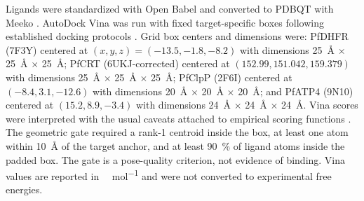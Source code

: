 \documentclass[11pt,a4paper]{article}
\begin{document}
	Ligands were standardized with Open Babel \cite{OBoyle2011} and converted to PDBQT with Meeko \cite{Eberhardt2021}. AutoDock Vina was run with fixed target-specific boxes following established docking protocols \cite{Trott2009}. Grid box centers and dimensions were: PfDHFR (7F3Y) centered at $(x,y,z) = (\num{-13.5}, \num{-1.8}, \num{-8.2})$ with dimensions \qty{25}{\angstrom} $\times$ \qty{25}{\angstrom} $\times$ \qty{25}{\angstrom}; PfCRT (6UKJ-corrected) centered at $(\num{152.99}, \num{151.042}, \num{159.379})$ with dimensions \qty{25}{\angstrom} $\times$ \qty{25}{\angstrom} $\times$ \qty{25}{\angstrom}; PfClpP (2F6I) centered at $(\num{-8.4}, \num{3.1}, \num{-12.6})$ with dimensions \qty{20}{\angstrom} $\times$ \qty{20}{\angstrom} $\times$ \qty{20}{\angstrom}; and PfATP4 (9N10) centered at $(\num{15.2}, \num{8.9}, \num{-3.4})$ with dimensions \qty{24}{\angstrom} $\times$ \qty{24}{\angstrom} $\times$ \qty{24}{\angstrom}. Vina scores were interpreted with the usual caveats attached to empirical scoring functions \cite{Quiroga2016}. The geometric gate required a rank-1 centroid inside the box, at least one atom within \qty{10}{\angstrom} of the target anchor, and at least \qty{90}{\percent} of ligand atoms inside the padded box. The gate is a pose-quality criterion, not evidence of binding. Vina values are reported in \si{\kilo\calorie\per\mol} and were not converted to experimental free energies.
	
\end{document}
